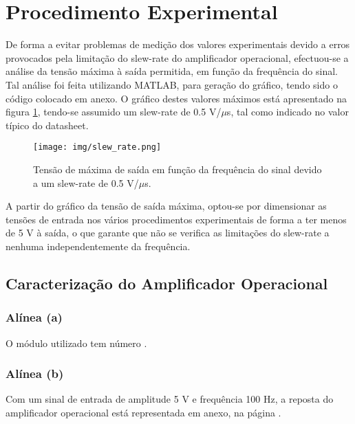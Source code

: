 
\section{Procedimento Experimental}

De forma a evitar problemas de medição dos valores experimentais devido a erros provocados pela limitação do slew-rate do amplificador operacional, efectuou-se a análise da tensão máxima à saída permitida, em função da frequência do sinal. Tal análise foi feita utilizando MATLAB, para geração do gráfico, tendo sido o código colocado em anexo. O gráfico destes valores máximos está apresentado na figura \ref{fig:slew_rate}, tendo-se assumido um slew-rate de 0.5 V/$\mu$s, tal como indicado no valor típico do datasheet.

\begin{figure}[!thpb]
\centering
\texttt{[image: img/slew\_rate.png]}
\caption{Tensão de máxima de saída em função da frequência do sinal devido a um slew-rate de 0.5 V/$\mu$s.}
\label{fig:slew_rate}
\end{figure}

A partir do gráfico da tensão de saída máxima, optou-se por dimensionar as tensões de entrada nos vários procedimentos experimentais de forma a ter menos de 5 V à saída, o que garante que não se verifica as limitações do slew-rate a nenhuma independentemente da frequência.

\subsection{Caracterização do Amplificador Operacional}

\subsubsection*{Alínea (a)}

O módulo utilizado tem número \quad\quad\quad.

\subsubsection*{Alínea (b)}

Com um sinal de entrada de amplitude 5 V e frequência 100 Hz, a reposta do amplificador operacional está representada em anexo, na página \quad\quad\quad.


